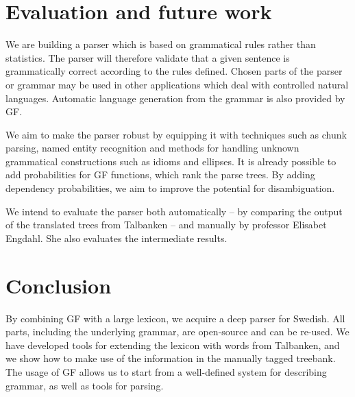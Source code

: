 \documentclass[submission]{eptcs} %
\begin{document}
\section{Evaluation and future work}
We are building a parser which is based on grammatical rules rather than
statistics. The parser will therefore validate that
a given sentence is grammatically correct according to the rules defined.
Chosen parts of the parser or grammar may be used in other applications
which deal with controlled natural languages. Automatic language
generation from the grammar is also provided by GF.

We aim to make the parser robust by equipping it with techniques such as chunk
parsing, named entity recognition and methods for handling unknown 
grammatical constructions such as idioms and ellipses. %
It is already possible to add probabilities for GF functions,
which rank the parse trees.
By adding dependency probabilities, we aim to improve the
potential for disambiguation.

We intend to evaluate the parser both automatically -- by comparing the output of
the translated trees from Talbanken -- and manually by professor Elisabet Engdahl.
She also evaluates the intermediate results.


\section{Conclusion}
By combining GF with a large lexicon, we acquire a deep parser for 
Swedish. All parts, including the underlying grammar, are open-source and can be re-used.
We have developed tools for extending the lexicon with words from Talbanken,
and we show how to make use of the information in the manually tagged
treebank.
The usage of GF allows us to start from
a well-defined system for describing grammar, as well as tools for
parsing.

\end{document}
